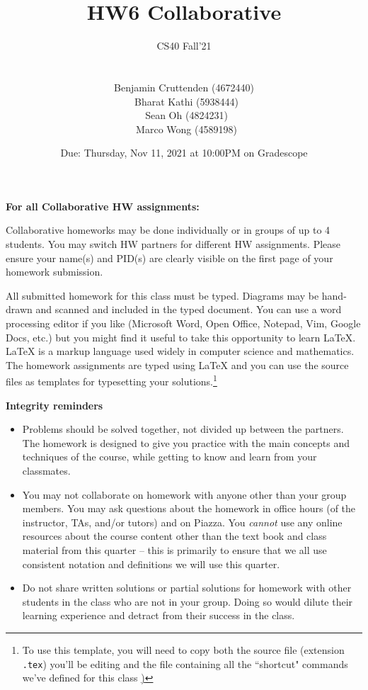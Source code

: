 \documentclass[12pt, oneside]{article}
\title{HW6 Collaborative}
\author{CS40 Fall'21\\\\\\
Benjamin Cruttenden (4672440)\\\
Bharat Kathi (5938444)\\\
Sean Oh (4824231)\\\
Marco Wong (4589198)}
\date{Due: Thursday, Nov 11, 2021 at 10:00PM on Gradescope}
\begin{document}
\maketitle

{\bf For all Collaborative HW assignments:}

Collaborative homeworks may be done individually or in groups of up to 4 students. You may switch HW partners for different HW assignments.  Please ensure your name(s) and PID(s) are clearly visible on the first page of your homework submission.

All submitted homework for this class must be typed. Diagrams may be hand-drawn and scanned and included in the typed document. You can use a word processing editor if you like (Microsoft Word, Open Office, Notepad, Vim, Google Docs, etc.) but you might find it useful to take this opportunity to learn LaTeX. LaTeX is a markup language used widely in computer science and mathematics. The homework assignments are typed using LaTeX and you can use the source files as templates for typesetting your solutions.\footnote{To use this template, you will need to copy both the source file (extension \texttt{.tex})  you'll be editing
and the file containing all the ``shortcut" commands we've defined for this class \href{https://drive.google.com/file/d/1FmQvgByKnNjTpIkAUw31TGWYrQZM-HK0/view?usp=sharing})}

{\bf Integrity reminders}
\begin{itemize}
\item Problems should be solved together, not divided up between the partners. The homework is
designed to give you practice with the main concepts and techniques of the course, while getting to know and learn from your classmates.
\item You may not collaborate on homework with anyone other than your group members.
You may ask questions about the homework in office hours (of the instructor, TAs, and/or tutors) and 
on Piazza.  You \emph{cannot} use any online resources about the course content other than the text
book and class material from this quarter -- this is primarily to ensure that we all use consistent notation and
definitions we will use this quarter.
\item Do not share written solutions or partial solutions for homework with other students in the class who are not in your group. Doing so would dilute their learning experience and detract from their success in the class.
\end{itemize}
\end{document}

